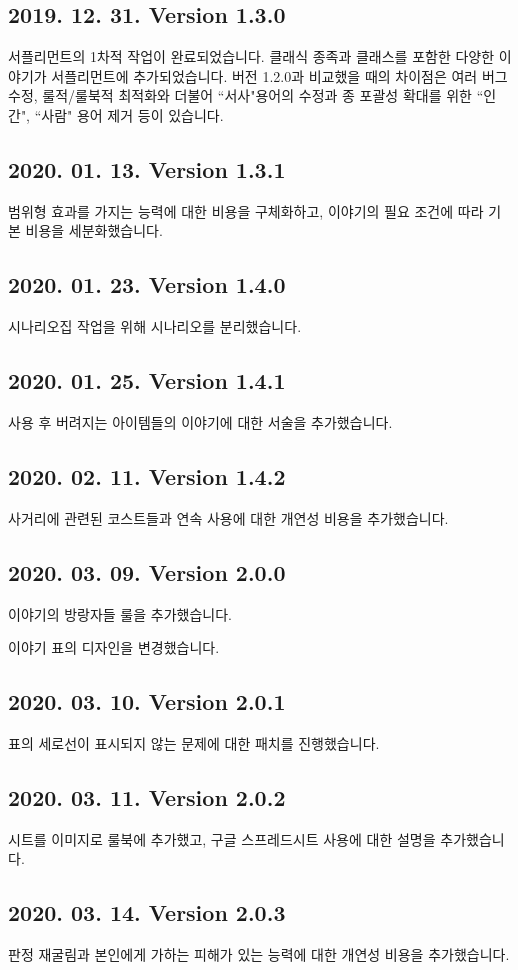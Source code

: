 \documentclass{report}
\begin{document}
	\subsection*{2019. 12. 31. Version 1.3.0}
	서플리먼트의 1차적 작업이 완료되었습니다. 클래식 종족과 클래스를 포함한 다양한 이야기가 서플리먼트에 추가되었습니다. 버전 1.2.0과 비교했을 때의 차이점은 여러 버그 수정, 룰적/룰북적 최적화와 더불어 ``서사"용어의 수정과 종 포괄성 확대를 위한 ``인간", ``사람" 용어 제거 등이 있습니다.
	
	\subsection*{2020. 01. 13. Version 1.3.1}
	범위형 효과를 가지는 능력에 대한 비용을 구체화하고, 이야기의 필요 조건에 따라 기본 비용을 세분화했습니다.
	
	\subsection*{2020. 01. 23. Version 1.4.0}
	시나리오집 작업을 위해 시나리오를 분리했습니다.
	
	\subsection*{2020. 01. 25. Version 1.4.1}
	사용 후 버려지는 아이템들의 이야기에 대한 서술을 추가했습니다.
	
	\subsection*{2020. 02. 11. Version 1.4.2}
	사거리에 관련된 코스트들과 연속 사용에 대한 개연성 비용을 추가했습니다.
\fi
	
	\subsection*{2020. 03. 09. Version 2.0.0}
	이야기의 방랑자들 룰을 추가했습니다.
	
	이야기 표의 디자인을 변경했습니다.
	
	\subsection*{2020. 03. 10. Version 2.0.1}
	표의 세로선이 표시되지 않는 문제에 대한 패치를 진행했습니다.
	
	\subsection*{2020. 03. 11. Version 2.0.2}
	시트를 이미지로 룰북에 추가했고, 구글 스프레드시트 사용에 대한 설명을 추가했습니다.
	
	\subsection*{2020. 03. 14. Version 2.0.3}
	판정 재굴림과 본인에게 가하는 피해가 있는 능력에 대한 개연성 비용을 추가했습니다.
\end{document}
